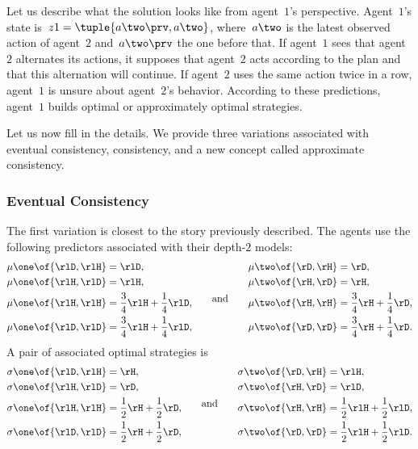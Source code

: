 Let us describe what the solution looks like from agent~\(1\)'s perspective.
Agent~\(1\)'s state is~\(z1 = \tuple{a\two\prv, a\two}\), where~\(a\two\) is the latest observed action of agent~\(2\) and~\(a\two\prv\) the one before that.
If agent~\(1\) sees that agent~\(2\) alternates its actions, it supposes that agent~\(2\) acts according to the plan and that this alternation will continue.
If agent~\(2\) uses the same action twice in a row, agent~\(1\) is unsure about agent~\(2\)'s behavior.
According to these predictions, agent~\(1\) builds optimal or approximately optimal strategies.

Let us now fill in the details.
We provide three variations associated with eventual consistency, consistency, and a new concept called approximate consistency.

\subsubsection{Eventual Consistency}
The first variation is closest to the story previously described.
The agents use the following predictors associated with their depth-\(2\) models:
\[
\begin{aligned}
\mu\one \of{\rlD, \rlH} & = \rlD, \\
\mu\one \of{\rlH, \rlD} & = \rlH, \\
\mu\one \of{\rlH, \rlH} & = \frac{3}{4} \rlH + \frac{1}{4} \rlD, \\
\mu\one \of{\rlD, \rlD} & = \frac{3}{4} \rlH + \frac{1}{4} \rlD, \\
\end{aligned}
\qquad\text{and}\qquad
\begin{aligned}
\mu\two \of{\rD, \rH} & = \rD, \\
\mu\two \of{\rH, \rD} & = \rH, \\
\mu\two \of{\rH, \rH} & = \frac{3}{4} \rH + \frac{1}{4} \rD, \\
\mu\two \of{\rD, \rD} & = \frac{3}{4} \rH + \frac{1}{4} \rD. \\
\end{aligned}
\]
A pair of associated optimal strategies is
\[
\begin{aligned}
\sigma\one \of{\rlD, \rlH} & = \rH, \\
\sigma\one \of{\rlH, \rlD} & = \rD, \\
\sigma\one \of{\rlH, \rlH} & = \frac{1}{2} \rH + \frac{1}{2} \rD, \\
\sigma\one \of{\rlD, \rlD} & = \frac{1}{2} \rH + \frac{1}{2} \rD, \\
\end{aligned}
\qquad\text{and}\qquad
\begin{aligned}
\sigma\two \of{\rD, \rH} & = \rlH, \\
\sigma\two \of{\rH, \rD} & = \rlD, \\
\sigma\two \of{\rH, \rH} & = \frac{1}{2} \rlH + \frac{1}{2} \rlD, \\
\sigma\two \of{\rD, \rD} & = \frac{1}{2} \rlH + \frac{1}{2} \rlD. \\
\end{aligned}
\]
